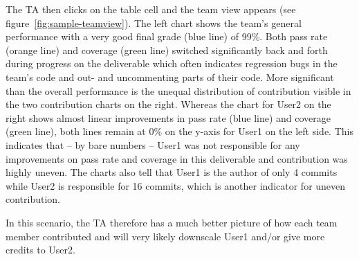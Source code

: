 \documentclass[../manifest.tex]{subfiles}
\begin{document}
The TA then clicks on the table cell and the team view appears (see figure~\ref{fig:sample-teamview}). The left chart shows the team's general performance with a very good final grade (blue line) of 99\%. Both pass rate (orange line) and coverage (green line) switched significantly back and forth during progress on the deliverable which often indicates regression bugs in the team's code and out- and uncommenting parts of their code. More significant than the overall performance is the unequal distribution of contribution visible in the two contribution charts on the right. Whereas the chart for User2 on the right shows almost linear improvements in pass rate (blue line) and coverage (green line), both lines remain at 0\% on the y-axis for User1 on the left side. This indicates that -- by bare numbers -- User1 was not responsible for any improvements on pass rate and coverage in this deliverable and contribution was highly uneven. The charts also tell that User1 is the author of only 4 commits while User2 is responsible for 16 commits, which is another indicator for uneven contribution.

In this scenario, the TA therefore has a much better picture of how each team member contributed and will very likely downscale User1 and/or give more credits to User2.
\end{document}

